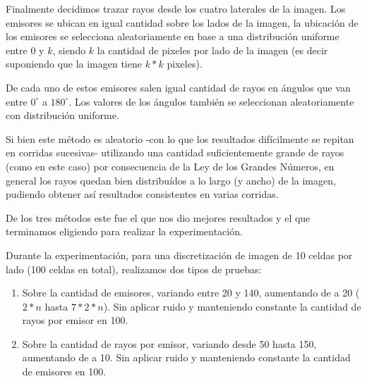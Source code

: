 \par Finalmente decidimos trazar rayos desde los cuatro laterales de la imagen. Los emisores se ubican en igual cantidad sobre los lados de la imagen, la ubicación de los emisores se selecciona aleatoriamente en base a una distribución uniforme entre $0$ y $k$, siendo $k$ la cantidad de pixeles por lado de la imagen (es decir suponiendo que la imagen tiene $k*k$ pixeles).

\par De cada uno de estos emisores salen igual cantidad de rayos en ángulos que van entre $0^{\circ}$ a $180^{\circ}$. Los valores de los ángulos también se seleccionan aleatoriamente con distribución uniforme.

\par Si bien este método es aleatorio -con lo que los resultados difícilmente se repitan en corridas sucesivas- utilizando una cantidad suficientemente grande de rayos (como en este caso) por consecuencia de la Ley de los Grandes Números, en general los rayos quedan bien distribuídos a lo largo (y ancho) de la imagen, pudiendo obtener así resultados consistentes en varias corridas.

\par De los tres métodos este fue el que nos dio mejores resultados y el que terminamos eligiendo para realizar la experimentación.

\par Durante la experimentación, para una discretización de imagen de 10 celdas por lado (100 celdas en total), realizamos dos tipos de pruebas:
\begin{enumerate}
\item Sobre la cantidad de emisores, variando entre 20 y 140, aumentando de a 20 ($2*n$ hasta $7*2*n$). Sin aplicar ruido y manteniendo constante la cantidad de rayos por emisor en 100.
\item Sobre la cantidad de rayos por emisor, variando desde 50 hasta 150, aumentando de a 10.  Sin aplicar ruido y manteniendo constante la cantidad de emisores en 100.
\end{enumerate}
